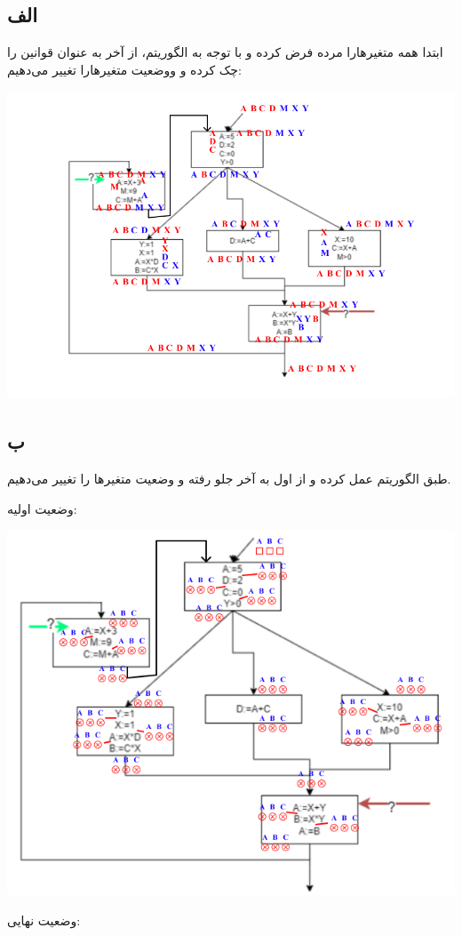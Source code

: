 \subsection*{الف}
ابتدا همه متغیرهارا مرده فرض کرده و با توجه به الگوریتم، از آخر به عنوان قوانین را چک کرده و ووضعیت متغیرهارا تغییر می‌دهیم:

\includegraphics[width=1\linewidth]{figs/1.png}

\pagebreak
\subsection*{ب}
طبق الگوریتم عمل کرده و از اول به آخر جلو رفته و وضعیت متغیرها را تغییر می‌دهیم.

وضعیت اولیه:


\qquad\includegraphics[width=0.8\linewidth]{figs/2.png}


وضعیت نهایی:

